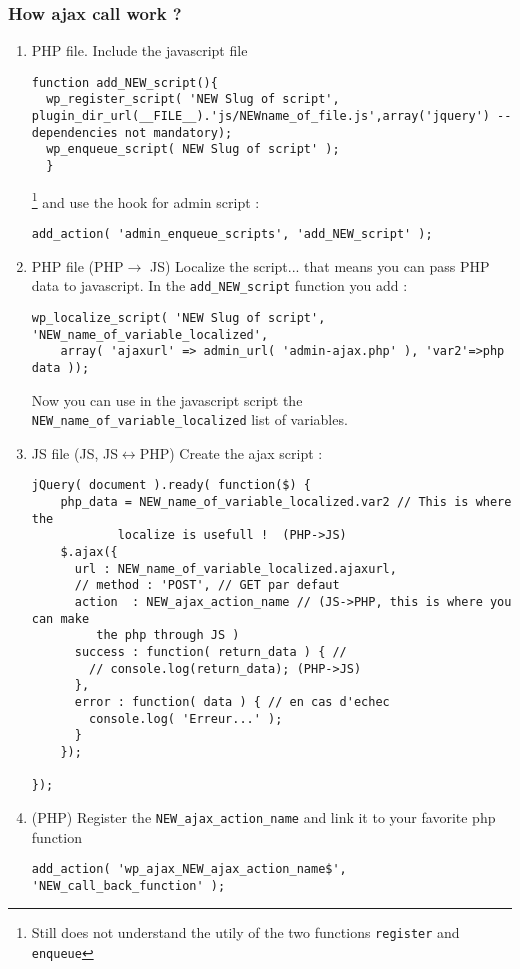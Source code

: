 \documentclass[11pt]{article}
\begin{document}
\subsubsection{How ajax call work  ? }
\begin{enumerate}
\item PHP file.  Include the javascript file 
\begin{lstlisting}
function add_NEW_script(){
  wp_register_script( 'NEW Slug of script', plugin_dir_url(__FILE__).'js/NEWname_of_file.js',array('jquery') -- dependencies not mandatory);
  wp_enqueue_script( NEW Slug of script' );
  }
\end{lstlisting}
\footnote{Still does not understand the utily of the two functions \texttt{register} and \texttt{enqueue}}
and use the hook for admin script :
\begin{lstlisting}
add_action( 'admin_enqueue_scripts', 'add_NEW_script' );
\end{lstlisting}

\item PHP file (PHP$\rightarrow$ JS) Localize the script... that means you can pass PHP data to javascript. In the \texttt{add\_NEW\_script} function you add :
\begin{lstlisting}
wp_localize_script( 'NEW Slug of script', 'NEW_name_of_variable_localized', 
	array( 'ajaxurl' => admin_url( 'admin-ajax.php' ), 'var2'=>php data ));
\end{lstlisting}
Now you can use in the javascript script the \texttt{NEW\_name\_of\_variable\_localized} list of variables. 

\item JS file (JS, JS$\leftrightarrow$PHP) Create the ajax script :
\begin{lstlisting}
jQuery( document ).ready( function($) {
    php_data = NEW_name_of_variable_localized.var2 // This is where the 
		    localize is usefull !  (PHP->JS)
    $.ajax({
      url : NEW_name_of_variable_localized.ajaxurl,  
      // method : 'POST', // GET par defaut
      action  : NEW_ajax_action_name // (JS->PHP, this is where you can make
      	 the php through JS )
      success : function( return_data ) { // 
        // console.log(return_data); (PHP->JS)
      },
      error : function( data ) { // en cas d'echec    
        console.log( 'Erreur...' );
      }
    });

});
\end{lstlisting}

\item (PHP) Register the \texttt{NEW\_ajax\_action\_name} and link it to your favorite php function 
\begin{lstlisting}
add_action( 'wp_ajax_NEW_ajax_action_name$', 'NEW_call_back_function' );
\end{lstlisting}



\end{enumerate}
\end{document}

